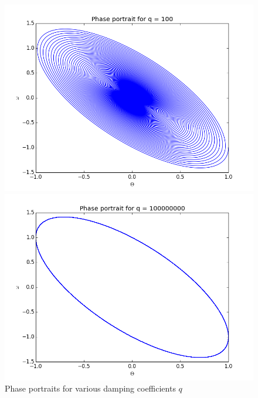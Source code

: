 \documentclass[12pt]{article}
\begin{document}
\begin{figure}
\begin{minipage}[t]{0.45\textwidth}
\end{minipage}
\begin{minipage}[t]{0.45\textwidth}
\includegraphics[width=\textwidth]{100.png}
\end{minipage}
\begin{minipage}[t]{0.45\textwidth}
\includegraphics[width=\textwidth]{1000000.png}
\end{minipage}
\caption{Phase portraits for various damping coefficients $q$}
\label{fig:1}   
\end{figure}
\end{document}
